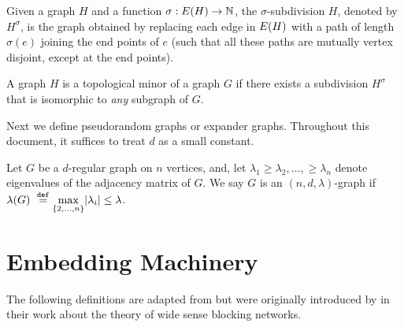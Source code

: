\documentclass[11pt]{article}
\newcommand{\EnDeeLambda}{(n, d, \lambda)}
\newcommand{\Subdivision}[2]{{#1}^{#2}}
\newcommand{\ExpansionFactor}[1]{\lambda(#1)}
\begin{document}
\begin{definition}\label{def:subdivisions}
Given a graph $H$ and a function $\sigma: E(H) \rightarrow \mathbb{N}$, the $\sigma$-subdivision $H$, denoted by $\Subdivision{H}{\sigma}$, is the graph obtained by replacing each edge in $E(H)$ with a path of length $\sigma(e)$ joining the end points of $e$ (such that all these paths are mutually vertex disjoint, except at the end points).	
\end{definition}

\begin{definition}\label{def:topological-minor}
A graph $H$ is a topological minor of a graph $G$ if there exists a subdivision $\Subdivision{H}{\sigma}$ that is isomorphic to \emph{any} subgraph of $G$.	
\end{definition}

Next we define pseudorandom graphs or expander graphs. 
Throughout this document, it suffices to treat $d$ as a small constant.

\begin{definition}[$\EnDeeLambda$ pseudorandom graphs]\label{def:expander-graphs}
Let $G$ be a $d$-regular graph on $n$ vertices, and, let $\lambda_1 \geq \lambda_2, \dots, \geq \lambda_n$ denote eigenvalues of the adjacency matrix of $G$.
We say $G$ is an $\EnDeeLambda$-graph if $\ExpansionFactor{\Graph} \Def \underset{{\{2, \dots, n\}}}{\max}|\lambda_i| \leq \lambda$.
\end{definition}


\begin{lemma}
	
\end{lemma}


\section{Embedding Machinery}

The following definitions are adapted from \citep{nenadov2023routing} but were originally introduced by \citet{feldman1988wide} in their work about the theory of wide sense blocking networks.
\end{document}
